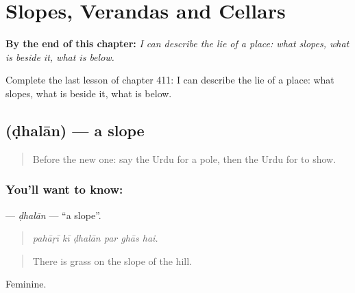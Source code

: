 
\chapter{Slopes, Verandas and Cellars}
\label{ch:ur-slopes-verandas-and-cellars}

\begin{chapteropening}
\textbf{By the end of this chapter:} \emph{I can describe the lie of a place: what slopes, what is beside it, what is below.}

Complete the last lesson of chapter 411: I can describe the lie of a place: what slopes, what is beside it, what is below.
\end{chapteropening}

\section[\texorpdfstring{\ur{ڈھلان} (ḍhalān)}{ڈھلان (ḍhalān)}]{ (ḍhalān) — a slope}

\label{lesson:UR-C411-dhalan}



\begin{quote}
Before the new one: say the Urdu for a pole, then the Urdu for to show.
\end{quote}

\subsection*{You'll want to know: }
\textbf{} — \emph{ḍhalān} — \textquotedblleft{}a slope\textquotedblright{}.

\begin{quote}
     
\end{quote}

\begin{quote}
\emph{pahāṛī kī ḍhalān par ghās hai.}
\end{quote}

\begin{quote}
There is grass on the slope of the hill.
\end{quote}

Feminine.

